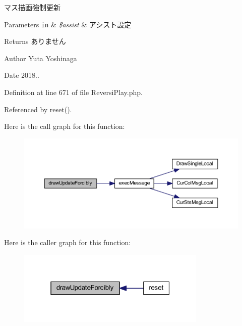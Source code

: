 マス描画強制更新 


\begin{DoxyParams}[1]{Parameters}
\mbox{\tt in}  & {\em \$assist} & アシスト設定 \\
\hline
\end{DoxyParams}
\begin{DoxyReturn}{Returns}
ありません 
\end{DoxyReturn}
\begin{DoxyAuthor}{Author}
Yuta Yoshinaga 
\end{DoxyAuthor}
\begin{DoxyDate}{Date}
2018.. 
\end{DoxyDate}


Definition at line 671 of file Reversi\+Play.\+php.



Referenced by reset().

Here is the call graph for this function\+:
\nopagebreak
\begin{figure}[H]
\begin{center}
\leavevmode
\includegraphics[width=350pt]{class_reversi_play_a3ae28eb121caf59932218ea7d1fca81d_cgraph}
\end{center}
\end{figure}
Here is the caller graph for this function\+:
\nopagebreak
\begin{figure}[H]
\begin{center}
\leavevmode
\includegraphics[width=256pt]{class_reversi_play_a3ae28eb121caf59932218ea7d1fca81d_icgraph}
\end{center}
\end{figure}
\mbox{\label{class_reversi_play_ae8beea2648c1c5cf722364e84a90edf9}} 
